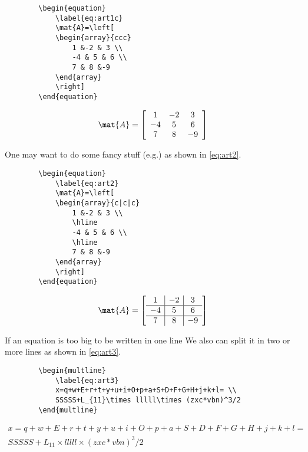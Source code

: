 \begin{SBN}
	\begin{verbatim}
		\begin{equation}
			\label{eq:art1c}
			\mat{A}=\left[
			\begin{array}{ccc}
				1 &-2 & 3 \\
				-4 & 5 & 6 \\
				7 & 8 &-9
			\end{array} 
			\right]
		\end{equation}
	\end{verbatim}
	\medskip
	\begin{equation}
		\label{eq:art1d}
		\mat{A}=\left[
		\begin{array}{ccc}
			1 &-2 & 3 \\
			-4 & 5 & 6 \\
			7 & 8 &-9
		\end{array} 
		\right]
	\end{equation}
\end{SBN}
%
%
One may want to do some fancy stuff (e.g.) as shown in \eqref{eq:art2}.
%
\begin{SBN}
	\begin{verbatim}
		\begin{equation}
			\label{eq:art2}
			\mat{A}=\left[
			\begin{array}{c|c|c}
				1 &-2 & 3 \\
				\hline
				-4 & 5 & 6 \\
				\hline
				7 & 8 &-9
			\end{array} 
			\right]
		\end{equation}
	\end{verbatim}
	\medskip
	\begin{equation}
		\label{eq:art2}
		\mat{A}=\left[
		\begin{array}{c|c|c}
			1 &-2 & 3 \\
			\hline
			-4 & 5 & 6 \\
			\hline
			7 & 8 &-9
		\end{array} 
		\right]
	\end{equation}
\end{SBN}
%
%
If an equation is too big to be written in one line We also can split it in two or more lines as shown in \eqref{eq:art3}.
%
%
\begin{SBN}
	\begin{verbatim}
		\begin{multline}
			\label{eq:art3}
			x=q+w+E+r+t+y+u+i+O+p+a+S+D+F+G+H+j+k+l= \\
			SSSSS+L_{11}\times lllll\times (zxc*vbn)^3/2
		\end{multline}
	\end{verbatim}
	\medskip
	\begin{multline}
		\label{eq:art3}
		x=q+w+E+r+t+y+u+i+O+p+a+S+D+F+G+H+j+k+l= \\
		SSSSS+L_{11}\times lllll\times (zxc*vbn)^3/2
	\end{multline}
\end{SBN}
